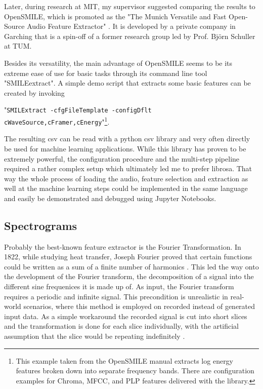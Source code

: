 Later, during research at MIT, my supervisor suggested comparing the results to OpenSMILE, which is promoted as the "The Munich Versatile and Fast Open-Source Audio Feature Extractor" \cite{Eyben:2013:RDO:2502081.2502224}. It is developed by a private company in Garching that is a spin-off of a former research group led by Prof. Björn Schuller at TUM.

Besides its versatility, the main advantage of OpenSMILE seems to be its extreme ease of use for basic tasks through its command line tool "SMILEextract". A simple demo script that extracts some basic features can be created by invoking 

"\texttt{SMILExtract -cfgFileTemplate -configDflt cWaveSource,cFramer,cEnergy}"\footnote{This example taken from the OpenSMILE manual extracts log energy features broken down into separate frequency bands. There are configuration examples for Chroma, MFCC, and PLP features delivered with the library.}.

The resulting csv can be read with a python csv library and very often directly be used for machine learning applications. While this library has proven to be extremely powerful, the  configuration procedure and the multi-step pipeline required a rather complex setup which ultimately led me to prefer librosa. That way the whole process of loading the audio, feature selection and extraction as well at the machine learning steps could be implemented in the same language and easily be demonstrated and debugged using Jupyter Notebooks.


\subsection{Spectrograms}

Probably the best-known feature extractor is the Fourier Transformation. In 1822, while studying heat transfer, Joseph Fourier proved that certain functions could be written as a sum of a finite number of harmonics \cite{fourier1878}. This led the way onto the development of the Fourier transform, the decomposition of a signal into the different sine frequenices it is made up of. As input, the Fourier transform requires a periodic and infinite signal. This precondition is unrealistic in real-world scenarios, where this method is employed on recorded instead of generated input data. As a simple workaround the recorded signal is cut into short slices and the transformation is done for each slice individually, with the artificial assumption that the slice would be repeating indefinitely \cite{Smith97}.

